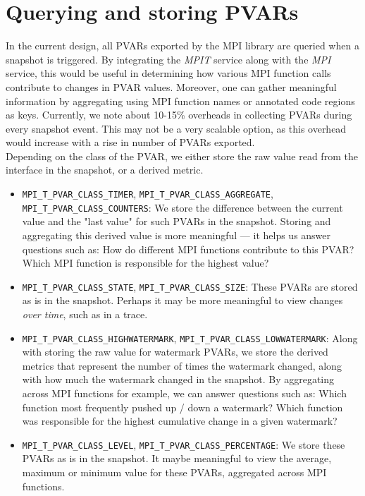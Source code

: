 \section{Querying and storing PVARs}
In the current design, all PVARs exported by the MPI library are queried when a snapshot is triggered. By integrating the \emph{MPIT} service along with the \emph{MPI} service, this would be useful in determining how various MPI function calls contribute to changes in PVAR values. Moreover, one can gather meaningful information by aggregating using MPI function names or annotated code regions as keys. Currently, we note about 10-15\% overheads in collecting PVARs during every snapshot event. This may not be a very scalable option, as this overhead would increase with a rise in number of PVARs exported.\\
Depending on the class of the PVAR, we either store the raw value read from the interface in the snapshot, or a derived metric.
\begin{itemize}
	\item \verb+MPI_T_PVAR_CLASS_TIMER+, \verb+MPI_T_PVAR_CLASS_AGGREGATE+, \\\verb+MPI_T_PVAR_CLASS_COUNTERS+: We store the difference between the current value and the "last value" for such PVARs in the snapshot. Storing and aggregating this derived value is more meaningful --- it helps us answer questions such as: How do different MPI functions contribute to this PVAR? Which MPI function is responsible for the highest value?
	\item \verb+MPI_T_PVAR_CLASS_STATE+, \verb+MPI_T_PVAR_CLASS_SIZE+: These PVARs are stored as is in the snapshot. Perhaps it may be more meaningful to view changes \emph{over time}, such as in a trace.
	\item \verb+MPI_T_PVAR_CLASS_HIGHWATERMARK+, \verb+MPI_T_PVAR_CLASS_LOWWATERMARK+: Along with storing the raw value for watermark PVARs, we store the derived metrics that represent the number of times the watermark changed, along with how much the watermark changed in the snapshot. By aggregating across MPI functions for example, we can answer questions such as: Which function most frequently pushed up / down a watermark? Which function was responsible for the highest cumulative change in a given watermark?
	\item \verb+MPI_T_PVAR_CLASS_LEVEL+, \verb+MPI_T_PVAR_CLASS_PERCENTAGE+: We store these PVARs as is in the snapshot. It maybe meaningful to view the average, maximum or minimum value for these PVARs, aggregated across MPI functions.
\end{itemize}

